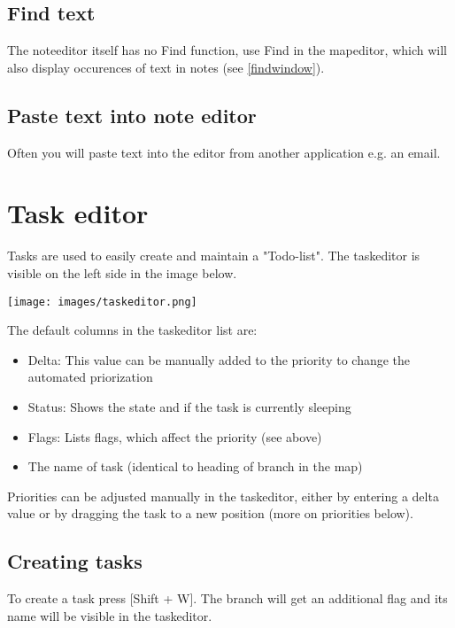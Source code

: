 \documentclass[12pt,a4paper]{article}
\newcommand{\key}[1]{[#1]}
\begin{document}
\subsection{Find text}
The noteeditor itself has no Find function, use Find in the mapeditor,
which will also display occurences of text in notes (see
\ref{findwindow}).

\subsection{Paste text into note editor}
Often you will paste text into the editor from another application e.g.
an email.

\section{Task editor} \label{taskeditor}
Tasks are used to easily create and maintain a "Todo-list". 
The taskeditor is visible on the left side in the image below. 
\begin{center}
    \texttt{[image: images/taskeditor.png]}
\end{center}

The default columns in the taskeditor list are:
\begin{itemize}
    \item Delta: This value can be manually added to the priority to change the automated priorization
    \item Status: Shows the state and if the task is currently sleeping
    \item Flags: Lists flags, which affect the priority (see above)
    \item The name of task (identical to heading of branch in the map)    
\end{itemize}
Priorities can be adjusted manually in the taskeditor, either by entering a
delta value or by dragging the task to a new position (more on priorities below).


\subsection{Creating tasks}
To create a task press \key{Shift + W}. The branch will get an
additional flag and its name will be visible in the taskeditor.
\end{document}
